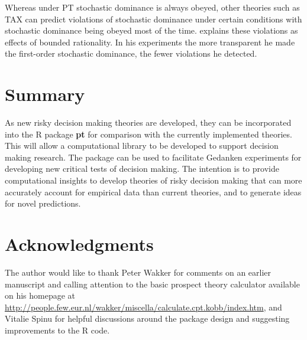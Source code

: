 \documentclass{article}\usepackage[]{graphicx}\usepackage[]{color}
\begin{document}
Whereas under PT stochastic dominance is always obeyed, other theories such as TAX can predict violations of stochastic dominance under certain conditions with stochastic dominance being obeyed most of the time. \cite{Levy_2008} explains these violations as effects of bounded rationality. In his experiments
the more transparent he made the first-order stochastic dominance, the fewer violations he detected.

\section{Summary}

As new risky decision making theories are developed, they can be incorporated into the R package {\bf pt} for comparison with the currently implemented theories. This will allow a computational library to be developed to support decision making research. The package can be used to facilitate Gedanken experiments for developing new critical tests of decision making. The intention is to provide computational insights to develop theories of risky decision making that can more accurately account for empirical data than current theories, and to generate ideas for novel predictions.

\section*{Acknowledgments}

The author would like to thank Peter Wakker for comments on an earlier manuscript and calling attention to the basic
prospect theory calculator available on his homepage at 
\url{http://people.few.eur.nl/wakker/miscella/calculate.cpt.kobb/index.htm}, and Vitalie Spinu for helpful discussions around the package design and suggesting improvements to the R code.




\end{document}
